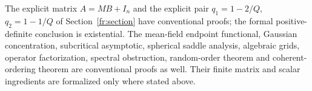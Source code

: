 The explicit matrix $A=MB+I_n$ and the explicit pair $q_1=1-2/Q$,
$q_2=1-1/Q$ of Section~\ref{fr:section} have conventional proofs; the
formal positive-definite conclusion is existential. The mean-field
endpoint functional, Gaussian concentration, subcritical asymptotic,
spherical saddle analysis, algebraic grids, operator factorization,
spectral obstruction, random-order theorem and coherent-ordering
theorem are conventional proofs as well. Their finite matrix and
scalar ingredients are formalized only where stated above.
